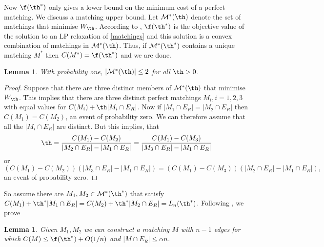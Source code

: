 \documentclass[12pt]{article}
\newcommand{\1}{\textbf{1}}
\def\a{\alpha} \def\b{\beta} \def\d{\delta} \def\D{\Delta}
\newtheorem{lemma}[theorem]{Lemma}
\def\cM{{\mathcal M}}
\newcommand{\beq}[2]{\begin{equation}\label{#1}#2\end{equation}}
\begin{document}
Now $\f(\th^*)$ only gives a lower bound on the minimum cost of a perfect matching. We discuss a matching upper bound.  Let $\cM^*(\th)$ denote the set of matchings that minimise $W_{\th}$. According to \cite{Ge}, $\f(\th^*)$ is the objective value of the  solution to an LP relaxation of \eqref{matchings} and this solution is a convex combination of matchings in $\cM^*(\th)$.  Thus, if $\cM^*(\th^*)$ contains a unique matching $M^*$ then $C(M^*)=\f(\th^*)$ and we are done.   
\begin{lemma}\label{cl1}
With probability one, $|\cM^*(\th)|\leq 2$ for all $\th > 0$.
\end{lemma}
\begin{proof}
Suppose that there are three distinct members of $\cM^*(\th)$ that minimise  $W_{\th}$. This implies that there are three distinct perfect matchings $M_i,i=1,2,3$ with equal values for  $C(M_i)+\th|M_i\cap E_R|$. Now if $|M_1\cap E_R|=|M_2\cap E_R|$ then $C(M_1)=C(M_2)$, an event of probability zero. We can therefore assume that all the $|M_i\cap E_R|$ are distinct. But this implies, that 
\beq{eqx}{
\th=\frac{C(M_1)-C(M_2)}{|M_2\cap E_R|-|M_1\cap E_R|}=\frac{C(M_1)-C(M_3)}{|M_3\cap E_R|-|M_1\cap E_R|}
}
or
\[
(C(M_1)-C(M_2))(|M_3\cap E_R|-|M_1\cap E_R|)=(C(M_1)-C(M_3))(|M_2\cap E_R|-|M_1\cap E_R|),
\]
 an event of probability zero.
\end{proof}
So assume there are $M_1,M_2\in \cM^*(\th^*)$  that satisfy $C(M_1)+\th^*|M_1\cap E_R|=C(M_2)+\th^* |M_2\cap E_R|=L_n(\th^*)$. Following \cite{BBGS}, we prove
\begin{lemma}\label{lemm}
Given $M_1,M_2$ we can construct a matching $M$ with $n-1$ edges for which $C(M)\leq \f(\th^*)+O(1/n)$ and $|M\cap E_R|\leq \a n$. 
\end{lemma}
\end{document}
